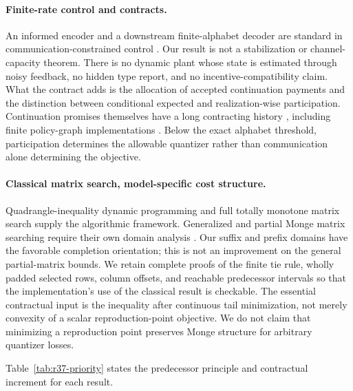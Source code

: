 \paragraph{Finite-rate control and contracts.}
An informed encoder and a downstream finite-alphabet decoder are standard in communication-constrained control \citep{Fu2024}. Our result is not a stabilization or channel-capacity theorem. There is no dynamic plant whose state is estimated through noisy feedback, no hidden type report, and no incentive-compatibility claim. What the contract adds is the allocation of accepted continuation payments and the distinction between conditional expected and realization-wise participation. Continuation promises themselves have a long contracting history \citep{SpearSrivastava1987,ThomasWorrall1988}, including finite policy-graph implementations \citep{Zhang2012}. Below the exact alphabet threshold, participation determines the allowable quantizer rather than communication alone determining the objective.

\paragraph{Classical matrix search, model-specific cost structure.}
Quadrangle-inequality dynamic programming \citep{Yao1980} and full totally monotone matrix search \citep{AggarwalEtAl1987} supply the algorithmic framework. Generalized and partial Monge matrix searching require their own domain analysis \citep{KlaweKleitman1990,Chan2021,Kaplan2017}. Our suffix and prefix domains have the favorable completion orientation; this is not an improvement on the general partial-matrix bounds. We retain complete proofs of the finite tie rule, wholly padded selected rows, column offsets, and reachable predecessor intervals so that the implementation's use of the classical result is checkable. The essential contractual input is the inequality after continuous tail minimization, not merely convexity of a scalar reproduction-point objective. We do not claim that minimizing a reproduction point preserves Monge structure for arbitrary quantizer losses.

Table~\ref{tab:r37-priority} states the predecessor principle and contractual increment for each result.

